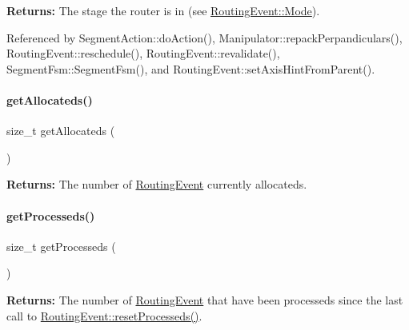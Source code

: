 {\bfseries Returns\+:} The stage the router is in (see \mbox{\hyperlink{classKite_1_1RoutingEvent_a46c8a310cf4c094f8c80e1cb8dc1f911}{Routing\+Event\+::\+Mode}}). 

Referenced by Segment\+Action\+::do\+Action(), Manipulator\+::repack\+Perpandiculars(), Routing\+Event\+::reschedule(), Routing\+Event\+::revalidate(), Segment\+Fsm\+::\+Segment\+Fsm(), and Routing\+Event\+::set\+Axis\+Hint\+From\+Parent().

\mbox{\label{classKite_1_1RoutingEvent_a91c8bc1a6bdb1b15c3c084ebfd38af47}} 
\paragraph{\texorpdfstring{get\+Allocateds()}{getAllocateds()}}
{\footnotesize\ttfamily size\+\_\+t get\+Allocateds (\begin{DoxyParamCaption}{ }\end{DoxyParamCaption})\hspace{0.3cm}{\ttfamily [static]}}

{\bfseries Returns\+:} The number of \mbox{\hyperlink{classKite_1_1RoutingEvent}{Routing\+Event}} currently allocateds. \mbox{\label{classKite_1_1RoutingEvent_a0a3993330692b7eb816e9c776d161ad1}} 
\paragraph{\texorpdfstring{get\+Processeds()}{getProcesseds()}}
{\footnotesize\ttfamily size\+\_\+t get\+Processeds (\begin{DoxyParamCaption}{ }\end{DoxyParamCaption})\hspace{0.3cm}{\ttfamily [static]}}

{\bfseries Returns\+:} The number of \mbox{\hyperlink{classKite_1_1RoutingEvent}{Routing\+Event}} that have been processeds since the last call to \mbox{\hyperlink{classKite_1_1RoutingEvent_a6cf10bb4e4488948e4c616c55a8e6514}{Routing\+Event\+::reset\+Processeds()}}. 

